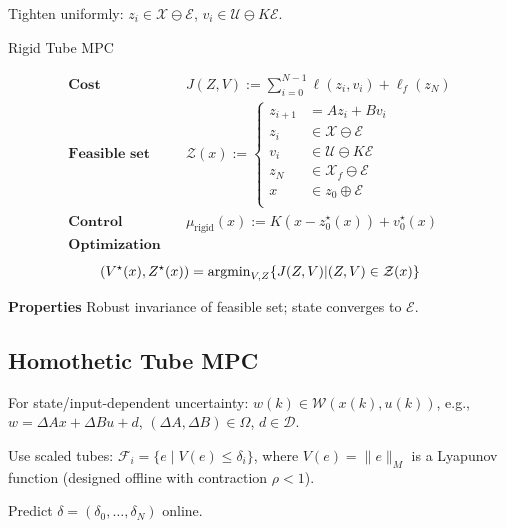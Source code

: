 Tighten uniformly: $z_i \in \mathcal{X} \ominus \mathcal{E}$, $v_i
\in \mathcal{U} \ominus K \mathcal{E}$.

\begin{sstTitleBox}[RoyalBlue]{Rigid Tube MPC}
  \begin{sstOnlyFrame}
    \[
      \begin{aligned}
        \textbf{Cost} & \quad
        J(Z,V):=\sum_{i=0}^{N-1}
        \ell(z_i,v_i)+\ell_f(z_N)
        \\
        \textbf{Feasible set}  & \quad
        \mathcal{Z}(x):=
        \begin{cases}
          z_{i+1} & = Az_i+Bv_i                         \\
          z_i     & \in \mathcal{X}\ominus\mathcal{E}   \\
          v_i     & \in \mathcal{U}\ominus K\mathcal{E} \\
          z_N     & \in \mathcal{X}_f \ominus \mathcal{E}                   \\
          x     & \in z_0\oplus\mathcal{E}            \\
        \end{cases}
        \\
        \textbf{Control}   & \quad
        \mu_\text{rigid}(x):=
        K(x-z_0^\star(x))+v_0^\star(x)
        \\
        \textbf{Optimization}
    \end{aligned}\]
    \[
      (V^\star(x),Z^\star(x))=
      \operatorname{argmin}_{V,Z}\{J(Z,V)|(Z,V)\in\mathcal{Z}(x)\}
    \]
  \end{sstOnlyFrame}
  \begin{sstOnlyFrame}
    \textbf{Properties}
    Robust invariance of feasible set; state converges to $\mathcal{E}$.
  \end{sstOnlyFrame}
\end{sstTitleBox}

\subsection{Homothetic Tube MPC}
For state/input-dependent uncertainty: $w(k) \in
\mathcal{W}(x(k),u(k))$, e.g., $w = \Delta A x + \Delta B u + d$,
$(\Delta A, \Delta B) \in \Omega$, $d \in \mathcal{D}$.

Use scaled tubes: $\mathcal{F}_i = \{e \mid V(e) \leq \delta_i\}$,
where $V(e) = \|e\|_M$ is a Lyapunov function (designed offline with
contraction $\rho < 1$).

Predict $\delta = (\delta_0,\dots,\delta_N)$ online.

